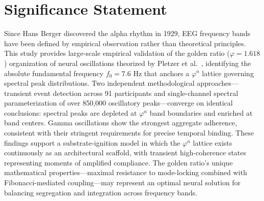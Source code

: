 \documentclass[11pt,a4paper]{article}
\newcommand{\phisym}{\varphi}
\begin{document}
\begin{abstract}
\textbf{Synthesis:} Two independent methodological approaches---transient event detection and single-channel spectral parameterization---converge on identical conclusions: neural oscillations follow $\phisym^n$ organization with perfect position ordering (Kendall's $\tau = 1.0$) across all analyses. The fundamental frequency $f_0 = 7.6$ Hz emerges independently from geophysical monitoring of Earth's Schumann Resonance and from neural spectral optimization, agreeing within 0.4\%. These findings support a ``substrate-ignition'' model: the $\phisym^n$ lattice exists continuously as an architectural scaffold organizing neural oscillations, while transient high-coherence events (SIEs) represent moments when this substrate is amplified and frequencies ``snap'' into tighter compliance. The golden ratio's unique mathematical properties---maximal resistance to mode-locking between frequency bands combined with precise Fibonacci-mediated cross-frequency coupling pathways---may represent evolution's solution to a fundamental computational challenge: maintaining independent parallel processing streams (segregation) while enabling flexible, controlled communication between them (integration).

\vspace{0.3cm}
\textbf{Keywords:} EEG, golden ratio, neural oscillations, frequency bands, phase synchronization, spectral architecture
\end{abstract}

\section*{Significance Statement}
Since Hans Berger discovered the alpha rhythm in 1929, EEG frequency bands have been defined by empirical observation rather than theoretical principles. This study provides large-scale empirical validation of the golden ratio ($\phisym = 1.618$) organization of neural oscillations theorized by Pletzer et al.\ \parencite{pletzer2010golden}, identifying the absolute fundamental frequency $f_0 = 7.6$ Hz that anchors a $\phisym^n$ lattice governing spectral peak distributions. Two independent methodological approaches---transient event detection across 91 participants and single-channel spectral parameterization of over 850,000 oscillatory peaks---converge on identical conclusions: spectral peaks are depleted at $\phisym^n$ band boundaries and enriched at band centers. Gamma oscillations show the strongest aggregate adherence, consistent with their stringent requirements for precise temporal binding. These findings support a substrate-ignition model in which the $\phisym^n$ lattice exists continuously as an architectural scaffold, with transient high-coherence states representing moments of amplified compliance. The golden ratio's unique mathematical properties---maximal resistance to mode-locking combined with Fibonacci-mediated coupling---may represent an optimal neural solution for balancing segregation and integration across frequency bands.
\end{document}
